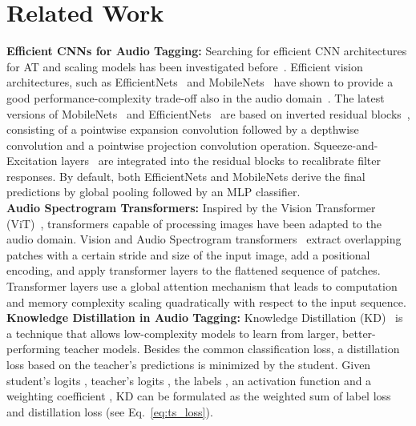 \documentclass{article}
\begin{document}
\vspace{-6pt}
\section{Related Work}
\label{sec:Related}

\textbf{Efficient CNNs for Audio Tagging:}
Searching for efficient CNN architectures for AT and scaling models has been investigated before~\cite{Kong20PANNs, Verbitskiy21ERANN, Gong21PSLA}. Efficient vision architectures, such as EfficientNets~\cite{Tan19EfficientNet, Tan21EfficientNetV2} and MobileNets~\cite{Howard17MobileNets, Sandler18MobileNetsV2, Howard19MobileNetV3} have shown to provide a good performance-complexity trade-off also in the audio domain~\cite{Kong20PANNs, Gong21PSLA, Gong22CMKD}. The latest versions of MobileNets~\cite{Howard19MobileNetV3} and EfficientNets~\cite{Tan21EfficientNetV2} are based on inverted residual blocks~\cite{Sandler18MobileNetsV2, Tan19EfficientNet}, consisting of a pointwise expansion convolution followed by a depthwise convolution and a pointwise projection convolution operation. Squeeze-and-Excitation layers~\cite{Hu18Squeeze} are integrated into the residual blocks to recalibrate filter responses. By default, both EfficientNets and MobileNets derive the final predictions by global pooling followed by an MLP classifier. 
\\
\textbf{Audio Spectrogram Transformers: }
Inspired by the Vision Transformer (ViT)~\cite{Dosovitskiy20Image}, transformers capable of processing images have been adapted to the audio domain. Vision and Audio Spectrogram transformers~\cite{Huang22Masked, Chen22HTS-AT, Koutini21Passt, Gong21Ast} extract overlapping patches with a certain stride and size of the input image, add a positional encoding, and apply transformer layers to the flattened sequence of patches. Transformer layers use a global attention mechanism that leads to computation and memory complexity scaling quadratically with respect to the input sequence.
\\
\textbf{Knowledge Distillation in Audio Tagging:}
Knowledge Distillation (KD)~\cite{Hinton2015distilling} is a technique that allows low-complexity models to learn from larger, better-performing teacher models. Besides the common classification loss, a distillation loss based on the teacher's predictions is minimized by the student. Given student's logits , teacher's logits , the labels , an activation function  and a weighting coefficient , KD can be formulated as the weighted sum of label loss  and distillation loss  (see Eq.~\ref{eq:ts_loss}).
\vspace{-2pt}
\end{document}
